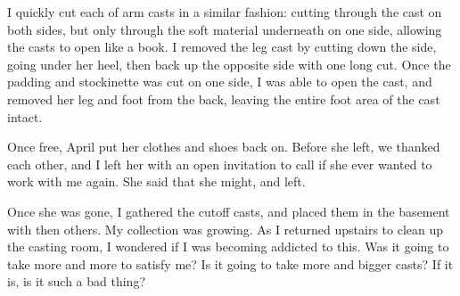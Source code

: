 I quickly cut each of arm casts in a similar fashion: cutting through the cast on both sides,
but only through the soft material underneath on one side, allowing the casts to open like a
book. I removed the leg cast by cutting down the side, going under her heel, then back up the
opposite side with one long cut. Once the padding and stockinette was cut on one side, I was
able to open the cast, and removed her leg and foot from the back, leaving the entire foot area
of the cast intact.

Once free, April put her clothes and shoes back on. Before she left, we thanked each other, and
I left her with an open invitation to call if she ever wanted to work with me again. She said
that she might, and left.

Once she was gone, I gathered the cutoff casts, and placed them in the basement with then
others. My collection was growing. As I returned upstairs to clean up the casting room, I
wondered if I was becoming addicted to this. Was it going to take more and more to satisfy me?
Is it going to take more and bigger casts? If it is, is it such a bad thing?
